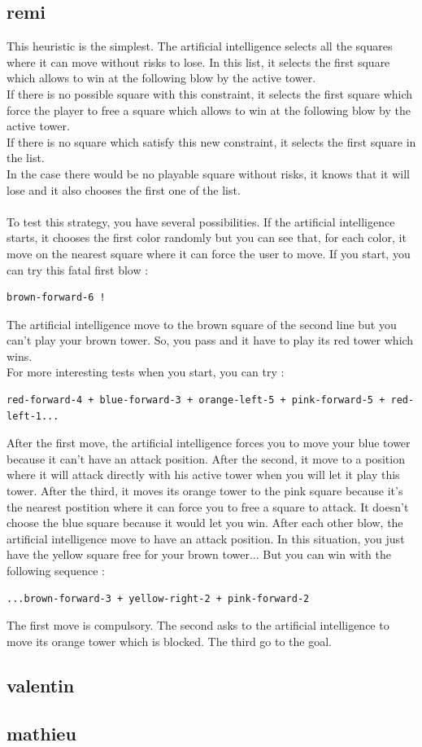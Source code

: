 \documentclass[a4paper, 11pt]{article}
\begin{document}
\subsection{remi}
This heuristic is the simplest. The artificial intelligence selects all the squares where it can move without risks to lose. In this list, it selects the first square which allows to win at the following blow by the active tower.\\
If there is no possible square with this constraint, it selects the first square which force the player to free a square which allows to win at the following blow by the active tower.\\
If there is no square which satisfy this new constraint, it selects the first square in the list.\\
In the case there would be no playable square without risks, it knows that it will lose and it also chooses the first one of the list.\\ \\
To test this strategy, you have several possibilities. If the artificial intelligence starts, it chooses the first color randomly but you can see that, for each color, it move on the nearest square where it can force the user to move.
If you start, you can try this fatal first blow : 
\begin{verbatim}
brown-forward-6 !
\end{verbatim}
The artificial intelligence move to the brown square of the second line but you can't play your brown tower. So, you pass and it have to play its red tower which wins.\\
For more interesting tests when you start, you can try :
\begin{verbatim}
red-forward-4 + blue-forward-3 + orange-left-5 + pink-forward-5 + red-left-1...
\end{verbatim}
After the first move, the artificial intelligence forces you to move your blue tower because it can't have an attack position. After the second, it move to a position where it will attack directly with his active tower when you will let it play this tower.
After the third, it moves its orange tower to the pink square because it's the nearest postition where it can force you to free a square to attack. It doesn't choose the blue square because it would let you win. After each other blow, the artificial intelligence move to have an attack position. 
In this situation, you just have the yellow square free for your brown tower... But you can win with the following sequence : 
\begin{verbatim}
...brown-forward-3 + yellow-right-2 + pink-forward-2
\end{verbatim}
The first move is compulsory. The second asks to the artificial intelligence to move its orange tower which is blocked. The third go to the goal.

\subsection{valentin}


\subsection{mathieu}
\end{document}
